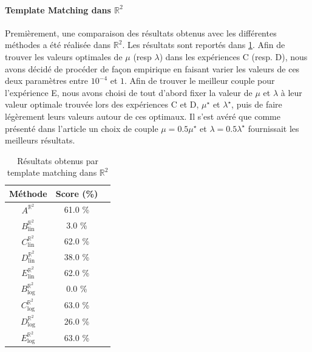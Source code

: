 \documentclass{article}
\begin{document}
\paragraph{Template Matching dans $\mathbb{R}^2$}
Premièrement, une comparaison des résultats obtenus avec les différentes méthodes a été réalisée dans $\mathbb{R}^2$.
Les résultats sont reportés dans \ref{table: R2}. Afin de trouver les valeurs optimales de $\mu$ (resp $\lambda$) dans les expériences C (resp. D), nous avons décidé 
de procéder de façon empirique en faisant varier les valeurs de ces deux paramètres entre $10^{-4}$ et $1$. Afin de trouver le meilleur couple pour l'expérience E, nous avons 
choisi de tout d'abord fixer la valeur de $\mu$ et $\lambda$ à leur valeur optimale
trouvée lors des expériences C et D, $ {\mu}^{\star}$ et $ {\lambda}^{\star}$, puis de faire légèrement leurs valeurs autour de ces optimaux.
Il s'est avéré que comme présenté dans l'article un choix de couple $\mu = 0.5
{\mu}^{\star}$ et $\lambda = 0.5 {\lambda}^{\star}$ fournissait les meilleurs résultats.

\begin{table}[h!]
    \centering
    \begin{tabular}{|c|c|c|}
        \hline
        Méthode & Score (\%)\\
        \hline
        \hline
        $A^{\mathbb{R}^2}$& 61.0 \% \\
        \hline
        $B_{\text{lin}}^{\mathbb{R}^2}$& 3.0 \%    \\
        $C_{\text{lin}}^{\mathbb{R}^2}$& 62.0 \%   \\
        $D_{\text{lin}}^{\mathbb{R}^2}$& 38.0 \%   \\
        $E_{\text{lin}}^{\mathbb{R}^2}$& 62.0 \%   \\
        \hline
        $B_{\text{log}}^{\mathbb{R}^2} $& 0.0 \%   \\ 
        $C_{\text{log}}^{\mathbb{R}^2} $& 63.0 \%  \\ 
        $D_{\text{log}}^{\mathbb{R}^2} $& 26.0 \%   \\ 
        $E_{\text{log}}^{\mathbb{R}^2} $& 63.0 \%  \\ 
        \hline
    \end{tabular}
    \caption{Résultats obtenus par template matching dans $\mathbb{R}^2$}
    \label{table: R2}
\end{table}
\end{document}
